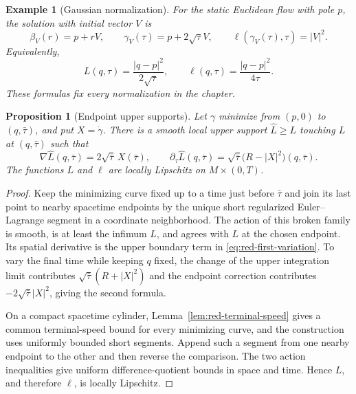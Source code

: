 \documentclass[10pt]{coll-l}
\newtheorem{example}[theorem]{Example}
\newtheorem{proposition}[theorem]{Proposition}
\theoremstyle{definition}
\theoremstyle{remark}
\numberwithin{section}{chapter}
\numberwithin{equation}{chapter}
\begin{document}
\begin{example}[Gaussian normalization]
\label{ex:red-Gaussian}
For the static Euclidean flow with pole $p$, the solution with initial vector
$V$ is
\begin{equation}
 \beta_V(r)=p+rV,
 \qquad \gamma_V(\tau)=p+2\sqrt\tau V,
 \qquad \ell(\gamma_V(\tau),\tau)=|V|^2.                \label{eq:red-Gaussian-initial-vector}
\end{equation}
Equivalently,
\begin{equation}
 L(q,\tau)=\frac{|q-p|^2}{2\sqrt\tau},
 \qquad \ell(q,\tau)=\frac{|q-p|^2}{4\tau}.             \label{eq:red-Gaussian-distance}
\end{equation}
These formulas fix every normalization in the chapter.
\end{example}

\begin{proposition}[Endpoint upper supports]
\label{prop:red-endpoint-supports}
Let $\gamma$ minimize from $(p,0)$ to $(q,\bar\tau)$, and put
$X=\dot\gamma$.  There is a smooth local upper support $\widehat L\geq L$
touching $L$ at $(q,\bar\tau)$ such that
\begin{equation}
 \nabla\widehat L(q,\bar\tau)=2\sqrt{\bar\tau}\,X(\bar\tau),
 \qquad
 \partial_\tau\widehat L(q,\bar\tau)
   =\sqrt{\bar\tau}\bigl(R-|X|^2\bigr)(q,\bar\tau).    \label{eq:red-endpoint-support-formulas}
\end{equation}
The functions $L$ and $\ell$ are locally Lipschitz on
$M\times(0,T)$.
\end{proposition}

\begin{proof}
Keep the minimizing curve fixed up to a time just before $\bar\tau$ and
join its last point to nearby spacetime endpoints by the unique short
regularized Euler--Lagrange segment in a coordinate neighborhood.  The
action of this broken family is smooth, is at least the infimum $L$, and
agrees with $L$ at the chosen endpoint.  Its spatial derivative is the
upper boundary term in \eqref{eq:red-first-variation}.  To vary the final
time while keeping $q$ fixed, the change of the upper integration limit
contributes $\sqrt{\bar\tau}(R+|X|^2)$ and the endpoint correction contributes
$-2\sqrt{\bar\tau}|X|^2$, giving the second formula.

On a compact spacetime cylinder, Lemma~\ref{lem:red-terminal-speed} gives a
common terminal-speed bound for every minimizing curve, and the construction
uses uniformly bounded short segments.  Append such a segment from one
nearby endpoint to the other and then reverse the comparison.  The two
action inequalities give uniform difference-quotient bounds in space and
time.  Hence $L$, and therefore $\ell$, is locally Lipschitz.
\end{proof}
\end{document}
